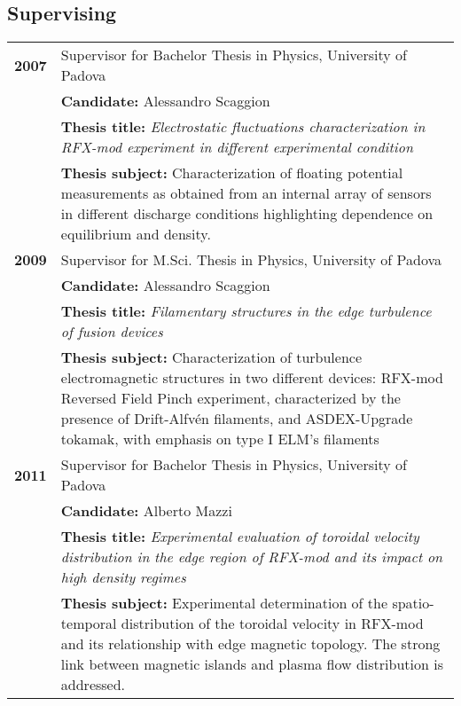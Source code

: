 \subsection{Supervising}
\begin{longtable}{>{\bfseries}l p{15cm}}
2007 & Supervisor for Bachelor Thesis in Physics, University of Padova \\
 & \textbf{Candidate:} Alessandro Scaggion \\
 & \textbf{Thesis title:} \emph{Electrostatic fluctuations characterization in
   RFX-mod experiment in different experimental condition} \\
 & \textbf{Thesis subject:} Characterization of floating potential
 measurements as obtained from an internal array of sensors in
 different discharge conditions highlighting dependence on
 equilibrium and density. \\
2009 & Supervisor for M.Sci. Thesis in Physics, University of Padova \\
 & \textbf{Candidate:} Alessandro Scaggion \\
& \textbf{Thesis title:} \emph{Filamentary structures in the edge
  turbulence of fusion devices} \\
& \textbf{Thesis subject:} Characterization of turbulence
electromagnetic structures in two different devices: RFX-mod Reversed
Field Pinch experiment, characterized by the presence of
Drift-Alfv\'en filaments, and ASDEX-Upgrade tokamak, with emphasis on
type I ELM's filaments \\
2011 & Supervisor for Bachelor Thesis in Physics, University of Padova \\
 & \textbf{Candidate:} Alberto Mazzi \\
 & \textbf{Thesis title:} \emph{Experimental evaluation of toroidal
   velocity distribution in the edge region of RFX-mod and its impact
   on high density regimes } \\
 & \textbf{Thesis subject:} Experimental determination of the
 spatio-temporal distribution of the toroidal
 velocity  in RFX-mod and its relationship with edge magnetic
 topology. The strong link between magnetic islands and
 plasma flow distribution is addressed.\\

\end{longtable}

